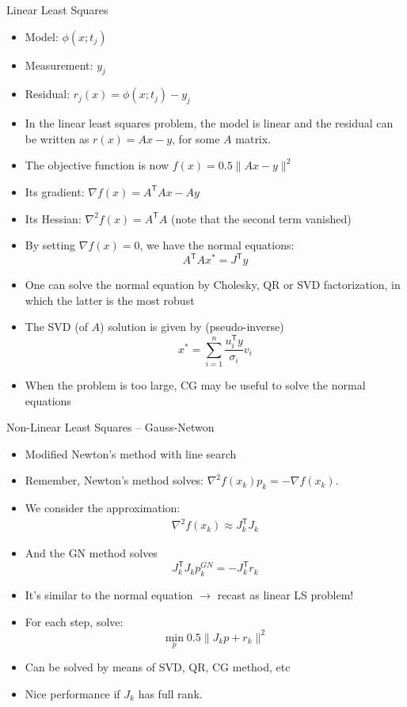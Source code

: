 \documentclass{beamer}
\newcommand{\tran}{\mathsf{T}}
\begin{document}
\begin{frame}[allowframebreaks]{Linear Least Squares}
	\begin{itemize}
		\item Model: $\phi(x;t_j)$
		\item Measurement: $y_j$
		\item Residual: $r_j(x) =\phi(x;t_j) - y_j$
		\item In the linear least squares problem, the model is linear and the residual can be written as $r(x) = Ax-y$, for some $A$ matrix.
		\item The objective function is now $f(x) = 0.5 \|Ax-y\|^2$
		\item Its gradient: $\nabla f(x) = A^\tran A x - Ay$
		\item Its Hessian: $\nabla^2 f(x) = A^\tran A$ (note that the second term vanished)
		\item By setting $\nabla f(x) = 0$, we have the normal equations:
		\[
			A^\tran A x^* = J^\tran y
		\]
		\item One can solve the normal equation by Cholesky, QR or SVD factorization, in which the latter is the most robust
		\item The SVD (of $A$) solution is given by (pseudo-inverse)
		\[
			x^* = \sum_{i=1}^n \frac{u_i^\tran y}{\sigma_i}v_i
		\]
		\item When the problem is too large, CG may be useful to solve the normal equations
	\end{itemize}
\end{frame}

\begin{frame}{Non-Linear Least Squares -- Gauss-Netwon}
	\begin{itemize}
		\item Modified Newton's method with line search
		\item Remember, Newton's method solves: $\nabla^2 f(x_k) p_k = -\nabla f(x_k)$.
		\item We consider the approximation:
		\begin{gather}
			\nabla^2 f(x_k) \approx J_k^\tran J_k
		\end{gather}
		\item And the GN method solves
		\[
			J_k^\tran J_k p_k^{GN} = -J_k^\tran r_k
		\]
		\item It's similar to the normal equation $\rightarrow$ recast as linear LS problem!
		\item For each step, solve:
		\[
			\min_p 0.5 \| J_k p + r_k \|^2
		\]
		\item Can be solved by means of SVD, QR, CG method, etc
		\item Nice performance if $J_k$ has full rank.
	\end{itemize}
\end{frame}
\end{document}

